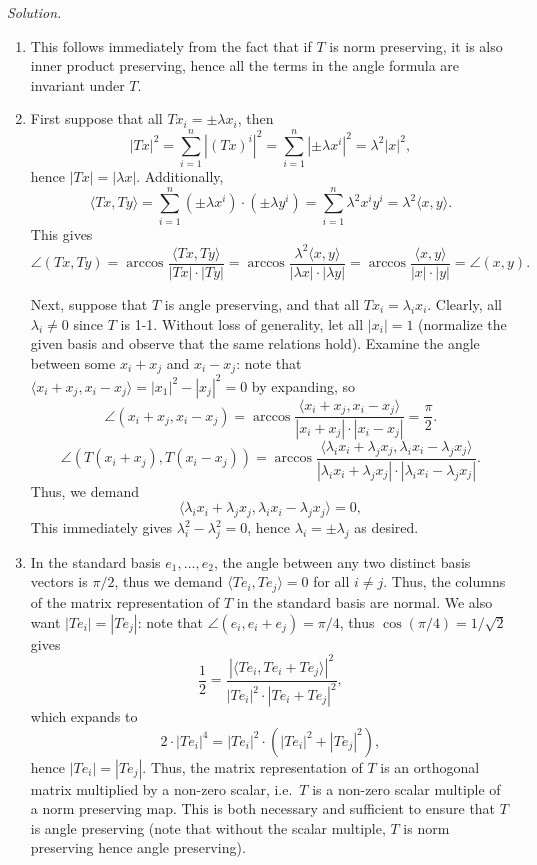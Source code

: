 \documentclass[11pt]{report}
\newcommand{\ip}[2]{\langle #1, #2 \rangle}
\newcommand{\solution}{\noindent\textit{Solution.} }
\begin{document}
    \solution
    \begin{enumerate}
        \item This follows immediately from the fact that if $T$ is norm preserving,
        it is also inner product preserving, hence all the terms in the angle formula
        are invariant under $T$.

        \item First suppose that all $Tx_i = \pm\lambda x_i$, then \[
            |Tx|^2 = \sum_{i = 1}^n |(Tx)^i|^2 = \sum_{i = 1}^n |\pm\lambda x^i|^2 =
            \lambda^2|x|^2,
        \] hence $|Tx| = |\lambda x|$. Additionally, \[
            \ip{Tx}{Ty} = \sum_{i = 1}^n (\pm\lambda x^i)\cdot (\pm\lambda y^i)
            = \sum_{i = 1}^n \lambda^2 x^iy^i
            = \lambda^2 \ip{x}{y}.
        \] This gives \[
            \angle(Tx, Ty) = \arccos\frac{\ip{Tx}{Ty}}{|Tx|\cdot |Ty|} = \arccos
            \frac{\lambda^2\ip{x}{y}}{|\lambda x|\cdot |\lambda y|} =
            \arccos\frac{\ip{x}{y}}{|x|\cdot |y|} = \angle(x, y).
        \] 

        Next, suppose that $T$ is angle preserving, and that all $Tx_i = \lambda_i
        x_i$. Clearly, all $\lambda_i \neq 0$ since $T$ is 1-1. Without loss of
        generality, let all $|x_i| = 1$ (normalize the given basis and observe that
        the same relations hold). Examine the angle
        between some $x_i + x_j$ and $x_i - x_j$: note that $\ip{x_i + x_j}{x_i -
        x_j} = |x_1|^2 - |x_j|^2 = 0$ by expanding, so \[
            \angle(x_i + x_j, x_i - x_j) = \arccos\frac{\ip{x_i + x_j}{x_i -
            x_j}}{|x_i + x_j|\cdot |x_i - x_j|} = \frac{\pi}{2}.
        \] \[
            \angle(T(x_i + x_j), T(x_i - x_j)) =
            \arccos\frac{\ip{\lambda_ix_i + \lambda_jx_j}{\lambda_ix_i -
            \lambda_jx_j}}{|\lambda_ix_i + \lambda_jx_j|\cdot|\lambda_ix_i -
            \lambda_jx_j|}.
        \] Thus, we demand \[
            \ip{\lambda_ix_i + \lambda_jx_j}{\lambda_ix_i - \lambda_jx_j} = 0,
        \] This immediately gives $\lambda_i^2 - \lambda_j^2 = 0$, hence $\lambda_i =
        \pm\lambda_j$ as desired.

        \item In the standard basis $e_1, \dots, e_2$, the angle between any two
        distinct basis vectors is $\pi / 2$, thus we demand $\ip{Te_i}{Te_j} = 0$ for
        all $i \neq j$. Thus, the columns of the matrix representation of $T$ in the
        standard basis are normal. We also want $|Te_i| = |Te_j|$: note that
        $\angle(e_i, e_i + e_j) = \pi / 4$, thus $\cos(\pi / 4) = 1 / \sqrt{2}$ gives
        \[
            \frac{1}{2} = \frac{|\ip{Te_i}{Te_i + Te_j}|^2}{|Te_i|^2 \cdot |Te_i + Te_j|^2},
        \] which expands to \[
            2\cdot |Te_i|^4 = |Te_i|^2\cdot (|Te_i|^2 + |Te_j|^2),
        \] hence $|Te_i| = |Te_j|$. Thus, the matrix representation of $T$ is an
        orthogonal matrix multiplied by a non-zero scalar, i.e.\ $T$ is a non-zero
        scalar multiple of a norm preserving map. This is both necessary and
        sufficient to ensure that $T$ is angle preserving (note that without the
        scalar multiple, $T$ is norm preserving hence angle preserving).
    \end{enumerate}
\end{document}
